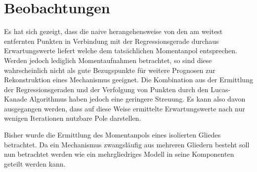 \section{Beobachtungen}
Es hat sich gezeigt, dass die naive herangehensweise von den am weitest entfernten Punkten in Verbindung mit der Regressionsgerade durchaus Erwartungswerte liefert welche dem tatsächlichen Momentanpol entsprechen.
Werden jedoch lediglich Momentaufnahmen betrachtet, so sind diese wahrscheinlich nicht als gute Bezugspunkte für weitere Prognosen zur Rekonstruktion eines Mechanismus geeignet.
Die Kombination aus der Ermittlung der Regressionsgeraden und der Verfolgung von Punkten durch den Lucas-Kanade Algorithmus haben jedoch eine geringere Streuung.
Es kann also davon ausgegangen werden, dass auf diese Weise ermittelte Erwartungswerte nach nur wenigen Iterationen nutzbare Pole darstellen.

Bisher wurde die Ermittlung des Momentanpols eines isolierten Gliedes betrachtet.
Da ein Mechanismus zwangsläufig aus mehreren Gliedern besteht soll nun betrachtet werden wie ein mehrgliedriges Modell in seine Komponenten geteilt werden kann.
